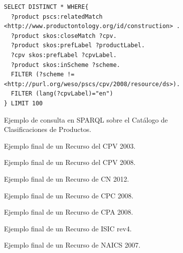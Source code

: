 \begin{figure}[!htp]
\begin{lstlisting} 
SELECT DISTINCT * WHERE{
  ?product pscs:relatedMatch <http://www.productontology.org/id/construction> .
  ?product skos:closeMatch ?cpv.
  ?product skos:prefLabel ?productLabel.
  ?cpv skos:prefLabel ?cpvLabel.
  ?product skos:inScheme ?scheme.
  FILTER (?scheme != <http://purl.org/weso/pscs/cpv/2008/resource/ds>).
  FILTER (lang(?cpvLabel)="en")
} LIMIT 100
\end{lstlisting}
	\caption{Ejemplo de consulta en SPARQL sobre el Catálogo de Clasificaciones de Productos.}
	\label{fig:pscs-sparql-query}
\end{figure}

\begin{figure}[!htp]

	\caption{Ejemplo final de un Recurso del CPV 2003.}
	\label{fig:pscs-example-cpv-2003}
\end{figure}

\begin{figure}[!htp]
	
	\caption{Ejemplo final de un Recurso del CPV 2008.}
	\label{fig:pscs-example-cpv-2008}
\end{figure}

\begin{figure}[!htp]

	\caption{Ejemplo final de un Recurso de CN 2012.}
	\label{fig:pscs-example-cn-2012}
\end{figure}

\begin{figure}[!htp]

	\caption{Ejemplo final de un Recurso de CPC 2008.}
	\label{fig:pscs-example-cpc-2008}
\end{figure}


\begin{figure}[!htp]

	\caption{Ejemplo final de un Recurso de CPA 2008.}
	\label{fig:pscs-example-cpa-2008}
\end{figure}


\begin{figure}[!htp]

	\caption{Ejemplo final de un Recurso de ISIC rev4.}
	\label{fig:pscs-example-isic-rev4}
\end{figure}


\begin{figure}[!htp]

	\caption{Ejemplo final de un Recurso de NAICS 2007.}
	\label{fig:pscs-example-naics-2007}
\end{figure}



